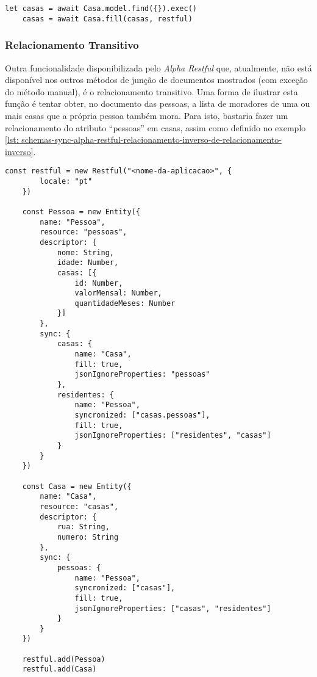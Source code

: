 \begin{lstlisting}[style=ES6, caption={Junção Com o \textit{Alpha Restful} em Relacionamento Inverso\label{lst: resultado-juncao-schemas-sync-alpha-restful-relacionamento-inverso}}]
	let casas = await Casa.model.find({}).exec()
	casas = await Casa.fill(casas, restful)
\end{lstlisting}

\subsubsection{Relacionamento Transitivo}

Outra funcionalidade disponibilizada pelo \textit{Alpha Restful} que, atualmente, não está disponível nos outros métodos de junção de documentos mostrados (com exceção do método manual), é o relacionamento transitivo. Uma forma de ilustrar esta função é tentar obter, no documento das pessoas, a lista de moradores de uma ou mais casas que a própria pessoa também mora. Para isto, bastaria fazer um relacionamento do atributo ``pessoas'' em casas, assim como definido no exemplo \ref{lst: schemas-sync-alpha-restful-relacionamento-inverso-de-relacionamento-inverso}.

\newpage

\begin{lstlisting}[style=ES6, caption={Relacionamento Inverso de Relacionamento Inverso \label{lst: schemas-sync-alpha-restful-relacionamento-inverso-de-relacionamento-inverso}}]
    const restful = new Restful("<nome-da-aplicacao>", {
        locale: "pt"
    })

    const Pessoa = new Entity({
        name: "Pessoa",
        resource: "pessoas",
        descriptor: {
            nome: String,
            idade: Number,
            casas: [{
                id: Number,
                valorMensal: Number,
                quantidadeMeses: Number
            }]
        },
        sync: {
            casas: {
                name: "Casa",
                fill: true,
                jsonIgnoreProperties: "pessoas"
            },
            residentes: {
                name: "Pessoa",
                syncronized: ["casas.pessoas"],
                fill: true,
                jsonIgnoreProperties: ["residentes", "casas"]
            }
        }
    })
    
    const Casa = new Entity({
        name: "Casa",
        resource: "casas",
        descriptor: {
            rua: String,
            numero: String
        },
        sync: {
            pessoas: {
                name: "Pessoa",
                syncronized: ["casas"],
                fill: true,
                jsonIgnoreProperties: ["casas", "residentes"]
            }
        }
    })
    
    restful.add(Pessoa)
    restful.add(Casa)
\end{lstlisting}

